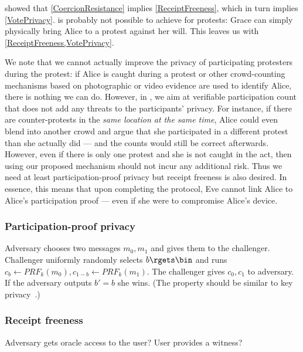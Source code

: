  showed that \cref{CoercionResistance} implies \cref{ReceiptFreeness}, which in turn implies \cref{VotePrivacy}. 
 is probably not possible to achieve for protests:
\eg Grace can simply physically bring Alice to a protest against her will.
This leaves us with \cref{ReceiptFreeness,VotePrivacy}.

We note that we cannot actually improve the privacy of participating protesters during the protest: if Alice is caught during a protest or other crowd-counting mechanisms based on photographic or video evidence are used to identify Alice, there is nothing we can do. 
However, in \PRIVO, we aim at verifiable participation count that does not add any threats to the participants' privacy. 
For instance, if there are counter-protests in the \emph{same location at the same time}, Alice could even blend into another crowd and argue that she participated in a different protest than she actually did --- and the counts would still be correct afterwards.
However, even if there is only one protest and she is not caught in the act, then using our proposed mechanism should not incur any additional risk.
Thus we need at least participation-proof privacy but receipt freeness is also desired.
In essence, this means that upon completing the protocol, Eve cannot link Alice to Alice's participation proof --- even if she were to compromise Alice's device.

\subsubsection{Participation-proof privacy}

\begin{definition}
  Adversary chooses two messages \(m_0, m_1\) and gives them to the challenger.
  Challenger uniformly randomly selects \(b\rgets \bin\) and runs \(c_b \gets 
    PRF_k(m_0), c_{1-b} \gets PRF_k(m_1)\).
  The challenger gives \(c_0, c_1\) to adversary.
  If the adversary outputs \(b' = b\) she wins.
  (The property should be similar to key privacy~\cite{KeyPrivacy}.)
\end{definition}

\subsubsection{Receipt freeness}

\begin{definition}
  Adversary gets oracle access to the user?
  User provides a witness?
\end{definition}

